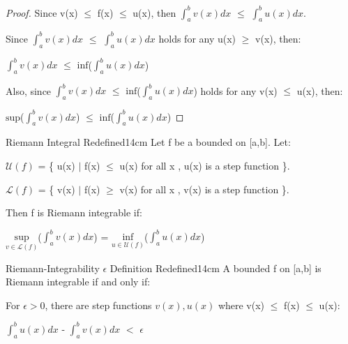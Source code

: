     \begin{proof}
        Since v(x) $\leq$ f(x) $\leq$ u(x), then
        $\int_a^b v(x) dx$ $\leq$ $\int_a^b u(x) dx$.
        
        Since $\int_a^b v(x) dx$ $\leq$ $\int_a^b u(x) dx$ holds for
        any u(x) $\geq$ v(x), then:

        \hspace{0.5cm}
        $\int_a^b v(x) dx$
        $\leq$ $\text{inf}$($\int_a^b u(x) dx$)

        Also, since $\int_a^b v(x) dx$
        $\leq$ $\text{inf}$($\int_a^b u(x) dx$)
        holds for any v(x) $\leq$ u(x), then:

        \hspace{0.5cm}
        $\text{sup}$($\int_a^b v(x) dx$)
        $\leq$ $\text{inf}$($\int_a^b u(x) dx$)
    \end{proof}

    \vspace{0.5cm}



    \begin{definition}{Riemann Integral Redefined}{14cm}
        Let f be a bounded on [a,b]. Let:

        \hspace{0.5cm}
        $\mathcal{U}(f)$
        = \{ u(x) $|$ f(x) $\leq$ u(x) for all x , u(x) is a step function \}.
        
        \hspace{0.5cm}
        $\mathcal{L}(f)$
        = \{ v(x) $|$ f(x) $\geq$ v(x) for all x , v(x) is a step function \}.

        Then f is Riemann integrable if:

        \hspace{0.5cm}
        $\underset{v \in \mathcal{L}(f)}{\text{sup}}$($\int_a^b v(x) dx$)
        = $\underset{u \in \mathcal{U}(f)}{\text{inf}}$($\int_a^b u(x) dx$)
    \end{definition}

    \vspace{0.5cm}



    \begin{wtheorem}{Riemann-Integrability $\epsilon$ Definition Redefined}{14cm}
        A bounded f on [a,b] is Riemann integrable if and only if:

        \hspace{0.5cm}
        For $\epsilon > 0$, there are step functions $v(x),u(x)$
        where v(x) $\leq$ f(x) $\leq$ u(x):

        \hspace{1cm}
        $\int_a^b u(x) dx$ - $\int_a^b v(x) dx$ $<$ $\epsilon$
    \end{wtheorem}

